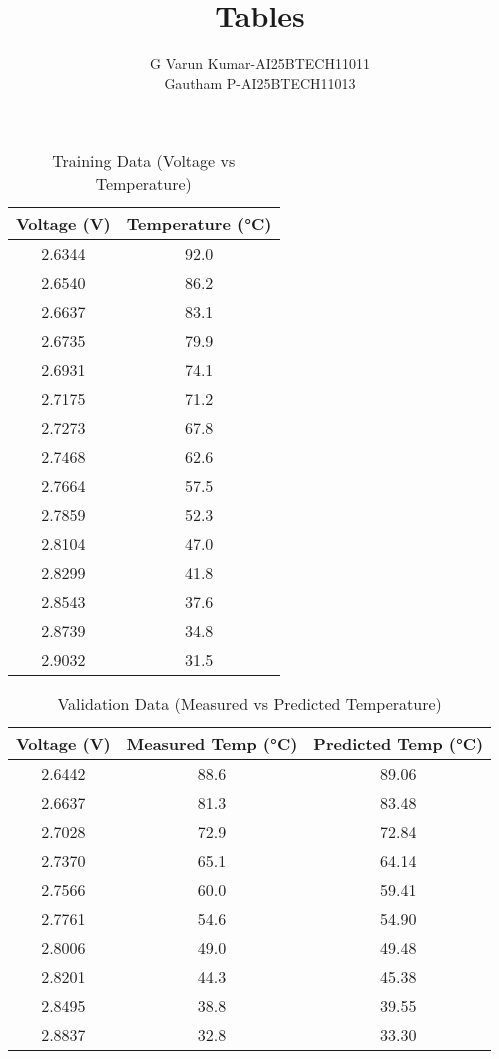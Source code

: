 \documentclass[a4paper,12pt]{article}
\begin{document}
\title{Tables}
\author{G Varun Kumar-AI25BTECH11011 \\
Gautham P-AI25BTECH11013}
\date{}
\maketitle

\begin{table}[h!]
\centering
\caption{Training Data (Voltage vs Temperature)}
\begin{tabular}{|c|c|}
\hline
\textbf{Voltage (V)} & \textbf{Temperature (°C)} \\ 
\hline
2.6344 & 92.0 \\
2.6540 & 86.2 \\
2.6637 & 83.1 \\
2.6735 & 79.9 \\
2.6931 & 74.1 \\
2.7175 & 71.2 \\
2.7273 & 67.8 \\
2.7468 & 62.6 \\
2.7664 & 57.5 \\
2.7859 & 52.3 \\
2.8104 & 47.0 \\
2.8299 & 41.8 \\
2.8543 & 37.6 \\
2.8739 & 34.8 \\
2.9032 & 31.5 \\
\hline
\end{tabular}
\end{table}

\begin{table}[h!]
\centering
\caption{Validation Data (Measured vs Predicted Temperature)}
\begin{tabular}{|c|c|c|}
\hline
\textbf{Voltage (V)} & \textbf{Measured Temp (°C)} & \textbf{Predicted Temp (°C)} \\ 
\hline
2.6442 & 88.6 & 89.06 \\
2.6637 & 81.3 & 83.48 \\
2.7028 & 72.9 & 72.84 \\
2.7370 & 65.1 & 64.14 \\
2.7566 & 60.0 & 59.41 \\
2.7761 & 54.6 & 54.90 \\
2.8006 & 49.0 & 49.48 \\
2.8201 & 44.3 & 45.38 \\
2.8495 & 38.8 & 39.55 \\
2.8837 & 32.8 & 33.30 \\
\hline
\end{tabular}
\end{table}
\end{document}
